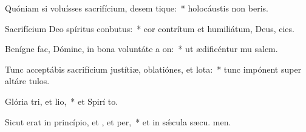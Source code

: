 \item Quóniam si voluísses sacrifícium, desem tique:~* holocáustis non beris.
\item Sacrifícium Deo spíritus conbutus:~* cor contrítum et humiliátum, Deus,  cies.
\item Benígne fac, Dómine, in bona voluntáte a on:~* ut ædificéntur mu salem.
\item Tunc acceptábis sacrifícium justítiæ, oblatiónes, et lota:~* tunc impónent super altáre  tulos.
\item Glória tri, et lio,~* et Spirí to.
\item Sicut erat in princípio, et , et per,~* et in sǽcula sæcu. men.
